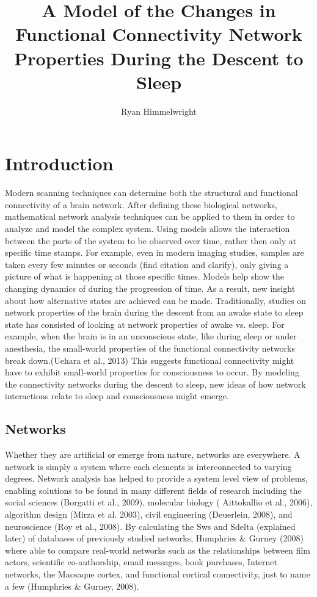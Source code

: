 \documentclass[11pt,letterpaper,doublespacing,titlepage]{article}
\author{Ryan Himmelwright}
\title{A Model of  the Changes in Functional Connectivity Network Properties During the Descent to Sleep}
\begin{document}
\maketitle
\section{Introduction}
\par
 Modern scanning techniques can determine both the structural and functional connectivity of a brain network. After defining these biological networks, mathematical network analysis techniques can be applied to them in order to analyze and model the complex system. Using models allows the interaction between the parts of the system to be observed over time, rather then only at specific time stamps. For example, even in modern imaging studies, samples are taken every few minutes or seconds (find citation and clarify), only giving a picture of what is happening at those specific times. Models help show the changing dynamics of during the progression of time. As a result, new insight about how alternative states are achieved can be made. Traditionally, studies on network properties of the brain during the descent from an awake state to sleep state has consisted of looking at network properties of awake vs. sleep. For example, when the brain is in an unconscious state, like during sleep or under anesthesia, the small-world properties of the functional connectivity networks break down.(Uehara et al., 2013) This suggests functional connectivity might have to exhibit small-world properties for consciousness to occur. By modeling the connectivity networks during the descent to sleep, new ideas of how network interactions relate to sleep and consciousness might emerge.
\subsection{Networks}
\par
Whether they are artificial or emerge from nature, networks are everywhere. A network is simply a system where each elements is interconnected to varying degrees. Network analysis has helped to provide a system level view of problems, enabling solutions to be found in many different fields of research including the social sciences (Borgatti et al., 2009), molecular biology ( Aittokallio et al., 2006), algorithm design (Mirza et al. 2003), civil engineering (Deuerlein, 2008), and neuroscience (Roy et al., 2008). By calculating the Sws and Sdelta (explained later) of databases of previously studied networks, Humphries \& Gurney (2008) where able to compare real-world networks such as the relationships between film actors, scientific co-authorship, email messages, book purchases, Internet networks, the Macsaque cortex, and functional cortical connectivity, just to name a few (Humphries \& Gurney, 2008).
\end{document}
